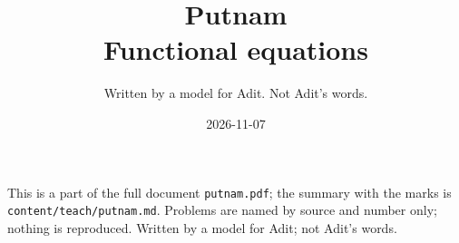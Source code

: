 
\title{Putnam\\[0.3em]\large Functional equations}
\author{Written by a model for Adit. Not Adit's words.}
\date{2026-11-07}

\maketitle
\noindent\small This is a part of the full document \texttt{putnam.pdf}; the summary with the marks is \texttt{content/teach/putnam.md}. Problems are named by source and number only; nothing is reproduced. Written by a model for Adit; not Adit's words.\normalsize



